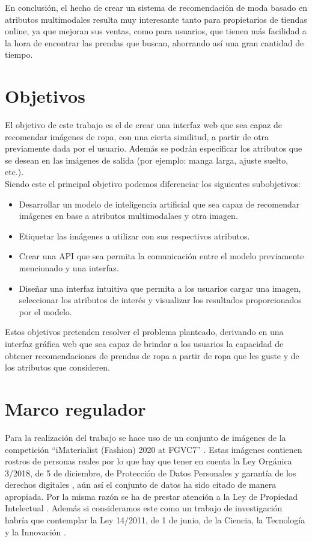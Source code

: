 \documentclass[12pt]{report} %
\begin{document}
	En conclusión, el hecho de crear un sistema de recomendación de moda basado en atributos multimodales
	resulta muy interesante tanto para propietarios de tiendas online, ya que mejoran sus ventas, como para
	usuarios, que tienen más facilidad a la hora de encontrar las prendas que buscan, ahorrando así una
	gran cantidad de tiempo.

	\section{Objetivos}
	El objetivo de este trabajo es el de crear una interfaz web que sea capaz de recomendar imágenes de
	ropa, con una cierta similitud, a partir de otra previamente dada por el usuario. Además se podrán 
	especificar los atributos que se desean en las imágenes de salida (por ejemplo: manga larga, ajuste suelto, etc.).
	\\
	Siendo este el principal objetivo podemos diferenciar los siguientes subobjetivos:
	\begin{itemize}
		\item Desarrollar un modelo de inteligencia artificial que sea capaz de recomendar imágenes en base a atributos multimodalaes y otra imagen.
		\item Etiquetar las imágenes a utilizar con sus respectivos atributos.
		\item Crear una API que sea permita la comunicación entre el modelo previamente mencionado y una interfaz.
		\item Diseñar una interfaz intuitiva que permita a los usuarios cargar una imagen, seleccionar los atributos de interés y visualizar los resultados proporcionados por el modelo.
	\end{itemize}

	Estos objetivos pretenden resolver el problema planteado, derivando en una interfaz gráfica web
	que sea capaz de brindar a los usuarios la capacidad de obtener recomendaciones de prendas 
	de ropa a partir de ropa que les guste y de los atributos que consideren. 
	\section{Marco regulador}
	Para la realización del trabajo se hace uso de un conjunto de imágenes de la competición 
	``iMaterialist (Fashion) 2020 at FGVC7'' \cite{imaterialist-fashion-2020-fgvc7}. Estas imágenes contienen 
	rostros de personas reales por lo que  hay que tener en cuenta la Ley Orgánica 3/2018, de 5 de diciembre, 
	de Protección de Datos Personales y garantía de los derechos digitales \cite{ley-proteccion-datos}, aún así el conjunto de datos
	ha sido citado de manera apropiada. Por la misma razón se ha de prestar atención a la Ley de Propiedad Intelectual \cite{ley-propiedad-intelectual}. 
	Además si consideramos este como un trabajo de investigación habría que contemplar la
	Ley 14/2011, de 1 de junio, de la Ciencia, la Tecnología y la Innovación \cite{ley-tecnologia}.
\end{document}
